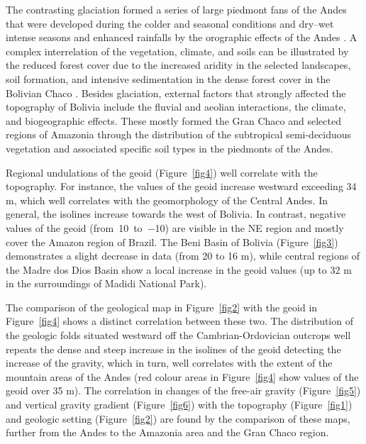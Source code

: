 \documentclass[data,article,accept,pdftex,moreauthors]{Definitions/mdpi}
\begin{document}
The contrasting glaciation formed {a series of} large piedmont fans of {the} Andes that were developed during {the} colder and seasonal conditions and dry–wet intense seasons and enhanced rainfalls by {the} orographic effects of the Andes \cite{Latrubesse2009,Latrubesse2012}. {A complex} interrelation of the vegetation, climate, and soils can be illustrated by the reduced forest cover {due to the} increased aridity in {the} selected landscapes{, }soil formation, and intensive sedimentation in the {dense} forest cover in the Bolivian Chaco \cite{May2008}. Besides glaciation, external factors that strongly affected the topography of Bolivia include {the} fluvial and aeolian interactions, the climate, and biogeographic effects. These mostly formed the Gran Chaco and {selected} regions of Amazonia through {the distribution of the} subtropical semi-deciduous vegetation {and associated specific soil types in} the {piedmonts of the} Andes.


Regional undulations of {the} geoid (Figure~\ref{fig4}) well correlate with the topography. {For instance}, the values of the geoid {increase }westward exceeding 34 m, which well correlates with the geomorphology of the Central Andes. {In general, the} isolines increase towards the west of Bolivia. In contrast, negative values of {the} geoid \mbox{(from 10 to $-$10)} are visible in the NE region {and} mostly cover the Amazon region of Brazil. The Beni Basin of Bolivia (Figure~\ref{fig3}) demonstrates {a} slight decrease in data (from 20 to 16 m){,} while {central} regions of the Madre dos Dios Basin {show} a local increase in {the} geoid values (up to 32 m in the surroundings of Madidi National Park). 

{The} comparison of {the} geological map in Figure~\ref{fig2} with {the} geoid in Figure~\ref{fig4} {shows a distinct correlation between these two}. The distribution of the geologic folds {situated} westward off the Cambrian-Ordovician outcrops well repeats the dense and steep increase in {the} isolines of the geoid detecting the increase of {the} gravity, which {in turn}, well correlates with the {extent of the} mountain areas of the Andes (red {colour} areas in Figure~\ref{fig4} show values of the geoid over 35 m). The correlation in changes of the free-air gravity (Figure~\ref{fig5}) and vertical gravity gradient (Figure~\ref{fig6}) with {the topography} (Figure~\ref{fig1}) and {geologic setting} (Figure~\ref{fig2}) are found by {the comparison of} these maps, further from the Andes to the Amazonia area and the Gran Chaco region. 
\end{document}
